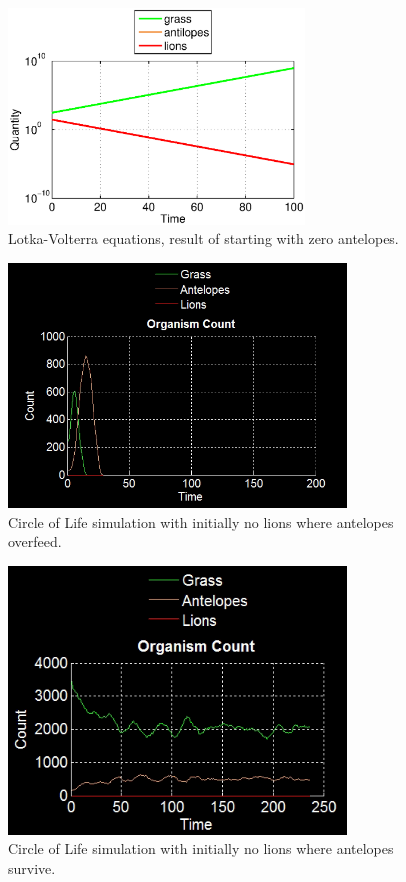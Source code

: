 \documentclass[11pt]{article}
\begin{document}
\begin{figure}
\centering
\includegraphics[width=0.7\textwidth]{LotkaVolterraNoAntelopes.eps}
\caption{Lotka-Volterra equations, result of starting with zero antelopes.}
\label{fig:LotkaNoAntelopes}
\end{figure}

\begin{figure}
\centering
\includegraphics[width=0.8\textwidth]{noLionsOnlyCount.png}
\caption{Circle of Life simulation with initially no lions where antelopes overfeed.}
\label{fig:noLions}
\end{figure}
\begin{figure}
\centering
\includegraphics[width=0.8\textwidth]{noLionsOnlyCountSurvive.png}
\caption{Circle of Life simulation with initially no lions where antelopes survive.}
\label{fig:noLionsSurv}
\end{figure}
\end{document}
